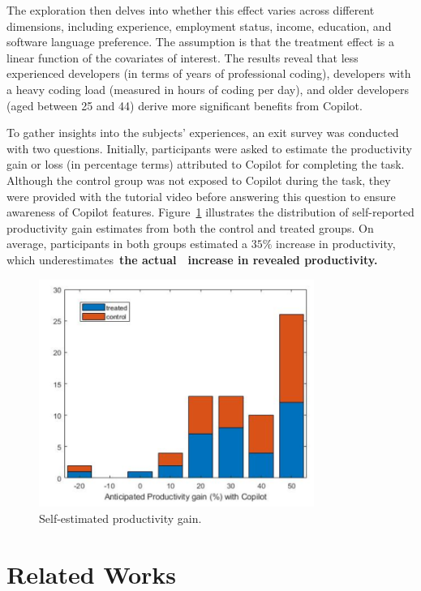 \documentclass[12pt]{extarticle}
\begin{document}
The exploration then delves into whether this effect varies across different dimensions, including experience, employment status, income, education, and software language preference. The assumption is that the treatment effect is a linear function of the covariates of interest. The results reveal that less experienced developers (in terms of years of professional coding), developers with a heavy coding load (measured in hours of coding per day), and older developers (aged between 25 and 44) derive more significant benefits from Copilot.

To gather insights into the subjects' experiences, an exit survey was conducted with two questions. Initially, participants were asked to estimate the productivity gain or loss (in percentage terms) attributed to Copilot for completing the task. Although the control group was not exposed to Copilot during the task, they were provided with the tutorial video before answering this question to ensure awareness of Copilot features. Figure~\ref{fig:productivity_gain} illustrates the distribution of self-reported productivity gain estimates from both the control and treated groups. On average, participants in both groups estimated a $35 \%$ increase in productivity, which underestimates~\textbf{the actual}~~\textbf{increase in revealed productivity.}

\begin{figure}[ht]
    \centering
    \includegraphics[width=0.8\textwidth]{img/productivity_gain.png}
    \caption{Self-estimated productivity gain.}\label{fig:productivity_gain}
\end{figure}

\section{Related Works}
\end{document}
